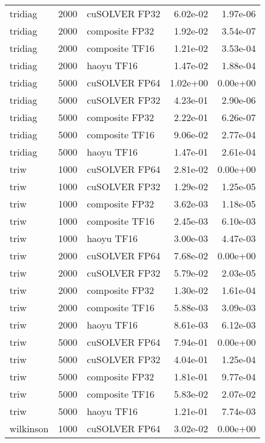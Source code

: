 \begin{table}
\begin{tabular}{lrlrr}
  tridiag &  2000 &  cuSOLVER FP32 &  6.02e-02 &        1.97e-06 \\
  tridiag &  2000 & composite FP32 &  1.92e-02 &        3.54e-07 \\
  tridiag &  2000 & composite TF16 &  1.21e-02 &        3.53e-04 \\
  tridiag &  2000 &     haoyu TF16 &  1.47e-02 &        1.88e-04 \\
  tridiag &  5000 &  cuSOLVER FP64 &  1.02e+00 &        0.00e+00 \\
  tridiag &  5000 &  cuSOLVER FP32 &  4.23e-01 &        2.90e-06 \\
  tridiag &  5000 & composite FP32 &  2.22e-01 &        6.26e-07 \\
  tridiag &  5000 & composite TF16 &  9.06e-02 &        2.77e-04 \\
  tridiag &  5000 &     haoyu TF16 &  1.47e-01 &        2.61e-04 \\
     triw &  1000 &  cuSOLVER FP64 &  2.81e-02 &        0.00e+00 \\
     triw &  1000 &  cuSOLVER FP32 &  1.29e-02 &        1.25e-05 \\
     triw &  1000 & composite FP32 &  3.62e-03 &        1.18e-05 \\
     triw &  1000 & composite TF16 &  2.45e-03 &        6.10e-03 \\
     triw &  1000 &     haoyu TF16 &  3.00e-03 &        4.47e-03 \\
     triw &  2000 &  cuSOLVER FP64 &  7.68e-02 &        0.00e+00 \\
     triw &  2000 &  cuSOLVER FP32 &  5.79e-02 &        2.03e-05 \\
     triw &  2000 & composite FP32 &  1.30e-02 &        1.61e-04 \\
     triw &  2000 & composite TF16 &  5.88e-03 &        3.09e-03 \\
     triw &  2000 &     haoyu TF16 &  8.61e-03 &        6.12e-03 \\
     triw &  5000 &  cuSOLVER FP64 &  7.94e-01 &        0.00e+00 \\
     triw &  5000 &  cuSOLVER FP32 &  4.04e-01 &        1.25e-04 \\
     triw &  5000 & composite FP32 &  1.81e-01 &        9.77e-04 \\
     triw &  5000 & composite TF16 &  5.83e-02 &        2.07e-02 \\
     triw &  5000 &     haoyu TF16 &  1.21e-01 &        7.74e-03 \\
wilkinson &  1000 &  cuSOLVER FP64 &  3.02e-02 &        0.00e+00 \\

\end{tabular}
\end{table}
